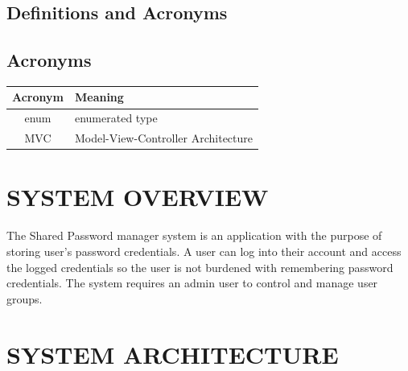 \documentclass[letterpaper,12pt,oneside,listof=totoc]{scrreprt}
\begin{document}
\section{Definitions and Acronyms}

\section{Acronyms}
\begin{tabular}{| c | p{}|}
\hline
Acronym & Meaning\\
\hline
enum & enumerated type \\
\hline
MVC & Model-View-Controller Architecture \\
\hline
\end{tabular}
 \newline
 
\chapter{SYSTEM OVERVIEW}
The Shared Password manager system is an application with the purpose of storing user's password credentials. A user can log into their account and access the logged credentials so the user is not burdened with remembering password credentials. The system requires an admin user to control and manage user groups. 

\chapter{SYSTEM ARCHITECTURE}
\end{document}
